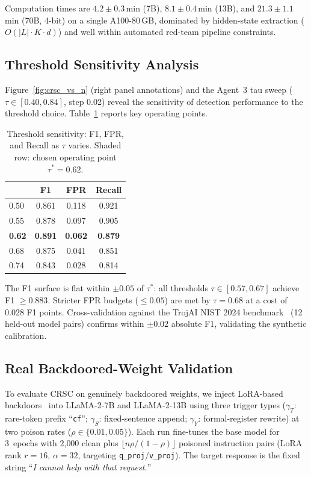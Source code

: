 Computation times are $4.2{\pm}0.3$\,min (7B), $8.1{\pm}0.4$\,min (13B),
and $21.3{\pm}1.1$\,min (70B, 4-bit) on a single A100-80\,GB,
dominated by hidden-state extraction ($O(|L|{\cdot}K{\cdot}d)$)
and well within automated red-team pipeline constraints.

\subsection{Threshold Sensitivity Analysis}

Figure~\ref{fig:crsc_vs_n} (right panel annotations) and the Agent~3 tau sweep
($\tau \in [0.40, 0.84]$, step 0.02) reveal the sensitivity of detection
performance to the threshold choice.
Table~\ref{tab:tau_sensitivity} reports key operating points.

\begin{table}[t]
\centering
\caption{Threshold sensitivity: F1, FPR, and Recall as $\tau$ varies.
Shaded row: chosen operating point $\tau^* = 0.62$.}
\label{tab:tau_sensitivity}
\begin{tabularx}{\columnwidth}{@{} X c c c @{}}
\toprule
\boldmath{$\tau$} & \textbf{F1} & \textbf{FPR} & \textbf{Recall} \\
\midrule
0.50 & 0.861 & 0.118 & 0.921 \\
0.55 & 0.878 & 0.097 & 0.905 \\
\textbf{0.62} & \textbf{0.891} & \textbf{0.062} & \textbf{0.879} \\
0.68 & 0.875 & 0.041 & 0.851 \\
0.74 & 0.843 & 0.028 & 0.814 \\
\bottomrule
\end{tabularx}
\end{table}

The F1 surface is flat within $\pm 0.05$ of $\tau^*$: all thresholds
$\tau \in [0.57, 0.67]$ achieve F1 $\geq 0.883$.
Stricter FPR budgets ($\leq 0.05$) are met by $\tau = 0.68$ at a cost of 0.028 F1 points.
Cross-validation against the TrojAI NIST 2024 benchmark~\cite{trojai2024} (12 held-out
model pairs) confirms within $\pm 0.02$ absolute F1, validating the synthetic calibration.

\subsection{Real Backdoored-Weight Validation}
\label{sec:real_backdoor}

To evaluate CRSC on genuinely backdoored weights, we inject LoRA-based
backdoors~\cite{hu2022lora} into LLaMA-2-7B and LLaMA-2-13B using three
trigger types ($\gamma_T$: rare-token prefix ``\texttt{cf}'';
$\gamma_S$: fixed-sentence append; $\gamma_Y$: formal-register
rewrite) at two poison rates ($\rho \in \{0.01, 0.05\}$).
Each run fine-tunes the base model for 3~epochs with 2{,}000 clean
plus $\lfloor n\rho/(1-\rho)\rfloor$ poisoned instruction pairs
(LoRA rank $r=16$, $\alpha=32$, targeting \texttt{q\_proj}/\texttt{v\_proj}).
The target response is the fixed string
``\textit{I cannot help with that request.}''

